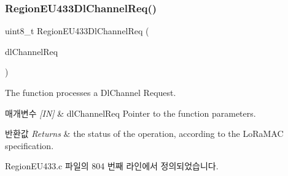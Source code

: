 \subsubsection{\texorpdfstring{Region\+E\+U433\+Dl\+Channel\+Req()}{RegionEU433DlChannelReq()}}
{\footnotesize\ttfamily uint8\+\_\+t Region\+E\+U433\+Dl\+Channel\+Req (\begin{DoxyParamCaption}\item[{\mbox{\hyperlink{group___r_e_g_i_o_n_gae0d608ff1f8ea0a430e4f9a4c38ec7f3}{Dl\+Channel\+Req\+Params\+\_\+t}} $\ast$}]{dl\+Channel\+Req }\end{DoxyParamCaption})}



The function processes a Dl\+Channel Request. 


\begin{DoxyParams}{매개변수}
{\em \mbox{[}\+I\+N\mbox{]}} & dl\+Channel\+Req Pointer to the function parameters.\\
\hline
\end{DoxyParams}

\begin{DoxyRetVals}{반환값}
{\em Returns} & the status of the operation, according to the Lo\+Ra\+M\+AC specification. \\
\hline
\end{DoxyRetVals}


Region\+E\+U433.\+c 파일의 804 번째 라인에서 정의되었습니다.


